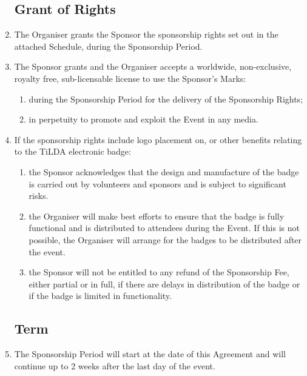 \begin{enumerate}

\subsection*{Grant of Rights}

\item The Organiser grants the Sponsor the sponsorship rights set out in the attached Schedule,
during the Sponsorship Period.

\item The Sponsor grants and the Organiser accepts a worldwide, non-exclusive, royalty free,
sub-licensable license to use the Sponsor's Marks:
\begin{enumerate}
    \item during the Sponsorship Period for the delivery of the Sponsorship Rights;
    \item in perpetuity to promote and exploit the Event in any media.
\end{enumerate}

\item If the sponsorship rights include logo placement on, or other benefits relating to the TiLDA
electronic badge:
\begin{enumerate}
    \item the Sponsor acknowledges that the design and manufacture of the badge is carried out
            by volunteers and sponsors and is subject to significant risks.
    \item the Organiser will make best efforts to ensure that the badge is fully functional and is
            distributed to attendees during the Event. If this is not possible, the Organiser
            will arrange for the badges to be distributed after the event.
    \item the Sponsor will not be entitled to any refund of the Sponsorship Fee, either partial
            or in full, if there are delays in distribution of the badge or if the badge is
            limited in functionality.
\end{enumerate}

\subsection*{Term}

\item The Sponsorship Period will start at the date of this Agreement and will continue up to
2 weeks after the last day of the event.


\end{enumerate}
